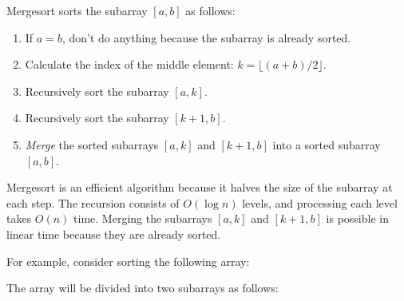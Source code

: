 Mergesort sorts the subarray $[a,b]$ as follows:

\begin{enumerate}
\item If $a=b$, don't do anything because the subarray is already sorted.
\item Calculate the index of the middle element: $k=\lfloor (a+b)/2 \rfloor$.
\item Recursively sort the subarray $[a,k]$.
\item Recursively sort the subarray $[k+1,b]$.
\item \emph{Merge} the sorted subarrays $[a,k]$ and $[k+1,b]$
into a sorted subarray $[a,b]$.
\end{enumerate}

Mergesort is an efficient algorithm because it
halves the size of the subarray at each step.
The recursion consists of $O(\log n)$ levels,
and processing each level takes $O(n)$ time.
Merging the subarrays $[a,k]$ and $[k+1,b]$
is possible in linear time because they are already sorted.

For example, consider sorting the following array:
\begin{center}
\end{center}

The array will be divided into two subarrays
as follows:
\begin{center}
\end{center}

